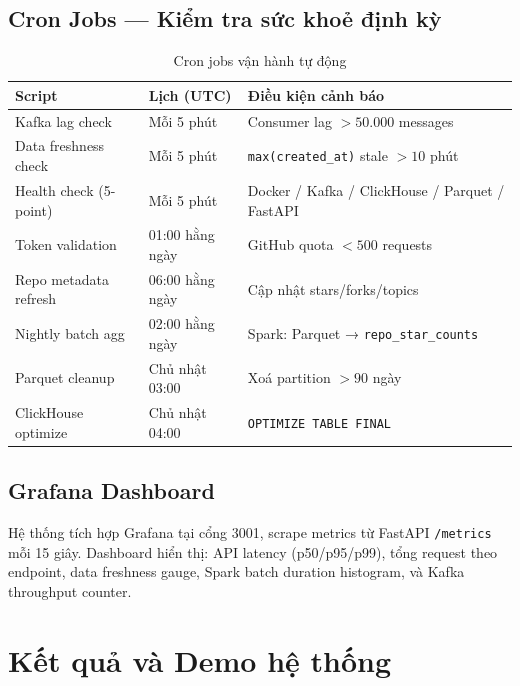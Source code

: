 \documentclass[12pt,a4paper]{article}
\newcommand{\tech}[1]{\texttt{#1}}
\begin{document}
\subsection{Cron Jobs — Kiểm tra sức khoẻ định kỳ}

\begin{table}[H]
  \centering
  \caption{Cron jobs vận hành tự động}
  \begin{tabularx}{\linewidth}{p{4.2cm}p{2.5cm}X}
    \toprule
    \textbf{Script} & \textbf{Lịch (UTC)} & \textbf{Điều kiện cảnh báo} \\
    \midrule
    Kafka lag check        & Mỗi 5 phút  & Consumer lag $> 50.000$ messages \\
    Data freshness check   & Mỗi 5 phút  & \tech{max(created\_at)} stale $> 10$ phút \\
    Health check (5-point) & Mỗi 5 phút  & Docker / Kafka / ClickHouse / Parquet / FastAPI \\
    Token validation       & 01:00 hằng ngày & GitHub quota $< 500$ requests \\
    Repo metadata refresh  & 06:00 hằng ngày & Cập nhật stars/forks/topics \\
    Nightly batch agg      & 02:00 hằng ngày & Spark: Parquet → \tech{repo\_star\_counts} \\
    Parquet cleanup        & Chủ nhật 03:00  & Xoá partition $> 90$ ngày \\
    ClickHouse optimize    & Chủ nhật 04:00  & \tech{OPTIMIZE TABLE FINAL} \\
    \bottomrule
  \end{tabularx}
\end{table}

\subsection{Grafana Dashboard}

Hệ thống tích hợp Grafana tại cổng 3001, scrape metrics từ FastAPI \tech{/metrics}
mỗi 15 giây. Dashboard hiển thị: API latency (p50/p95/p99), tổng request theo endpoint,
data freshness gauge, Spark batch duration histogram, và Kafka throughput counter.

\section{Kết quả và Demo hệ thống}
\end{document}
